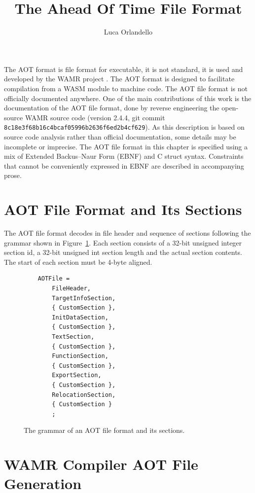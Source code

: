 \documentclass{article}
\title{The Ahead Of Time File Format}
\author{Luca Orlandello}
\begin{document}
\maketitle

\label{chapter:aot-file-format}
The AOT format is file format for executable, it is not standard, it is used and developed by the WAMR project \cite{wamr2026}.
The AOT format is designed to facilitate compilation from a WASM module to machine code.
The AOT file format is not officially documented anywhere.
One of the main contributions of this work is the documentation of the AOT file format, done by reverse engineering the open-source WAMR source code (version 2.4.4, git commit \texttt{8c18e3f68b16c4bcaf05996b2636f6ed2b4cf629}).
As this description is based on source code analysis rather than official documentation, some details may be incomplete or imprecise.
The AOT file format in this chapter is specified using a mix of Extended Backus–Naur Form (EBNF) \cite{wikipedia-ebnf} and C struct syntax.
Constraints that cannot be conveniently expressed in EBNF are described in accompanying prose.

\section{AOT File Format and Its Sections}
The AOT file format decodes in file header and sequence of sections following the grammar shown in Figure~\ref{listing:aot-file-grammar}.
Each section consists of a 32-bit unsigned integer section id, a 32-bit unsigned int section length and the actual section contents.
The start of each section must be 4-byte aligned.

\begin{figure}[H]
    \begin{verbatim}
    AOTFile =
        FileHeader,
        TargetInfoSection,
        { CustomSection },
        InitDataSection,
        { CustomSection },
        TextSection,
        { CustomSection },
        FunctionSection,
        { CustomSection },
        ExportSection,
        { CustomSection },
        RelocationSection,
        { CustomSection }
        ;
\end{verbatim}
\caption{The grammar of an AOT file format and its sections.}
\label{listing:aot-file-grammar}
\end{figure}


\section{WAMR Compiler AOT File Generation}
\label{subsec:how-wasmc-generates-aot}
\end{document}
